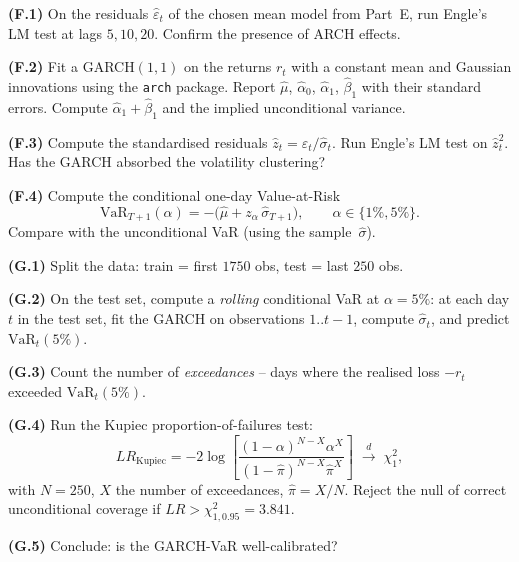 \documentclass[a4paper,11pt]{article}
\begin{document}
\begin{exercise}
\textbf{(F.1)} On the residuals $\widehat\varepsilon_t$ of the
chosen mean model from Part~E, run Engle's LM test at lags $5, 10,
20$. Confirm the presence of ARCH effects.

\textbf{(F.2)} Fit a GARCH$(1, 1)$ on the returns $r_t$ with a
constant mean and Gaussian innovations using the
\texttt{arch} package. Report
$\widehat\mu$, $\widehat\alpha_0$, $\widehat\alpha_1$,
$\widehat\beta_1$ with their standard errors. Compute
$\widehat\alpha_1 + \widehat\beta_1$ and the implied
unconditional variance.

\textbf{(F.3)} Compute the standardised residuals $\widehat z_t =
\widehat\varepsilon_t / \widehat\sigma_t$. Run Engle's LM test on
$\widehat z_t^2$. Has the GARCH absorbed the volatility clustering?

\textbf{(F.4)} Compute the conditional one-day Value-at-Risk
\[
  \mathrm{VaR}_{T+1}(\alpha)
  = -\bigl(\widehat\mu + z_\alpha\, \widehat\sigma_{T+1}\bigr),
  \qquad
  \alpha \in \{1\%, 5\%\}.
\]
Compare with the unconditional VaR (using the sample~$\widehat\sigma$).
\end{exercise}

\begin{exercise}
\textbf{(G.1)} Split the data: train = first $1750$ obs, test =
last $250$ obs.

\textbf{(G.2)} On the test set, compute a \emph{rolling}
conditional VaR at $\alpha = 5\%$: at each day $t$ in the test set,
fit the GARCH on observations $1..t-1$, compute
$\widehat\sigma_t$, and predict $\mathrm{VaR}_t(5\%)$.

\textbf{(G.3)} Count the number of \emph{exceedances} -- days where
the realised loss $-r_t$ exceeded $\mathrm{VaR}_t(5\%)$.

\textbf{(G.4)} Run the Kupiec proportion-of-failures test:
\[
  LR_{\text{Kupiec}}
  = -2 \log \left[
      \frac{(1 - \alpha)^{N - X} \alpha^X}
           {(1 - \widehat\pi)^{N - X} \widehat\pi^X}
    \right]
  \;\xrightarrow{d}\; \chi^2_1,
\]
with $N = 250$, $X$ the number of exceedances, $\widehat\pi = X / N$.
Reject the null of correct unconditional coverage if
$LR > \chi^2_{1, 0.95} = 3.841$.

\textbf{(G.5)} Conclude: is the GARCH-VaR well-calibrated?
\end{exercise}
\end{document}

